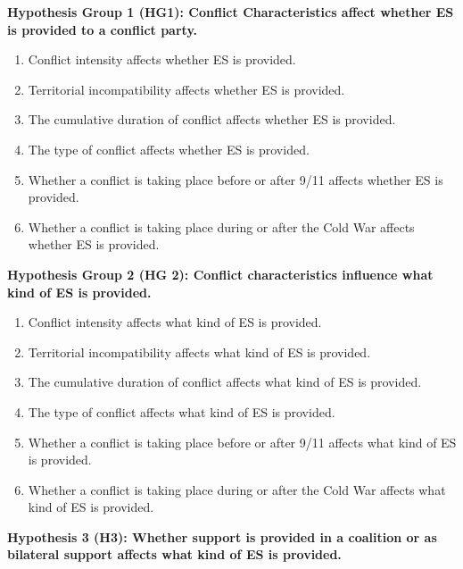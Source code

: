 \documentclass[
]{article}
\begin{document}
\textbf{Hypothesis Group 1 (HG1): Conflict Characteristics affect
whether ES is provided to a conflict party.}

\begin{enumerate}
\def\labelenumi{\alph{enumi})}
\item
  Conflict intensity affects whether ES is provided.
\item
  Territorial incompatibility affects whether ES is provided.
\item
  The cumulative duration of conflict affects whether ES is provided.
\item
  The type of conflict affects whether ES is provided.
\item
  Whether a conflict is taking place before or after 9/11 affects
  whether ES is provided.
\item
  Whether a conflict is taking place during or after the Cold War
  affects whether ES is provided.
\end{enumerate}

\textbf{Hypothesis Group 2 (HG 2): Conflict characteristics influence
what kind of ES is provided.}

\begin{enumerate}
\def\labelenumi{\alph{enumi})}
\item
  Conflict intensity affects what kind of ES is provided.
\item
  Territorial incompatibility affects what kind of ES is provided.
\item
  The cumulative duration of conflict affects what kind of ES is
  provided.
\item
  The type of conflict affects what kind of ES is provided.
\item
  Whether a conflict is taking place before or after 9/11 affects what
  kind of ES is provided.
\item
  Whether a conflict is taking place during or after the Cold War
  affects what kind of ES is provided.
\end{enumerate}

\textbf{Hypothesis 3 (H3): Whether support is provided in a coalition or
as bilateral support affects what kind of ES is provided.}
\end{document}
